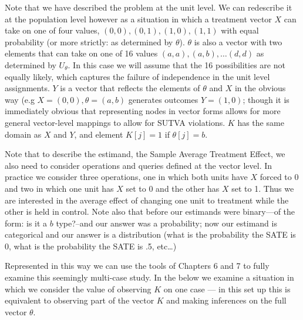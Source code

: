 \documentclass[12pt,]{book}
\begin{document}
Note that we have described the problem at the unit level. We can redescribe it at the population level however as a situation in which a treatment vector \(X\) can take on one of four values, \((0,0), (0,1), (1,0), (1,1)\) with equal probability (or more strictly: as determined by \(\theta\)). \(\theta\) is also a vector with two elements that can take on one of 16 values \((a,a), (a,b),\dots (d,d)\) as determined by \(U_\theta\). In this case we will assume that the 16 possibilities are not equally likely, which captures the failure of independence in the unit level assignments. \(Y\) is a vector that reflects the elements of \(\theta\) and \(X\) in the obvious way (e.g \(X=(0,0), \theta=(a,b)\) generates outcomes \(Y=(1,0)\); though it is immediately obvious that representing nodes in vector forms allows for more general vector-level mappings to allow for SUTVA violations. \(K\) has the same domain as \(X\) and \(Y\), and element \(K[j]=1\) if \(\theta[j]=b\).

Note that to describe the estimand, the Sample Average Treatment Effect, we also need to consider operations and queries defined at the vector level. In practice we consider three operations, one in which both units have \(X\) forced to 0 and two in which one unit has \(X\) set to 0 and the other has \(X\) set to 1. Thus we are interested in the average effect of changing one unit to treatment while the other is held in control. Note also that before our estimands were binary---of the form: is it a \(b\) type?--and our answer was a probability; now our estimand is categorical and our answer is a distribution (what is the probability the SATE is 0, what is the probability the SATE is .5, etc\ldots{})

Represented in this way we can use the tools of Chapters 6 and 7 to fully examine this seemingly multi-case study. In the below we examine a situation in which we consider the value of observing \(K\) on one case --- in this set up this is equivalent to observing part of the vector \(K\) and making inferences on the full vector \(\theta\).
\end{document}
